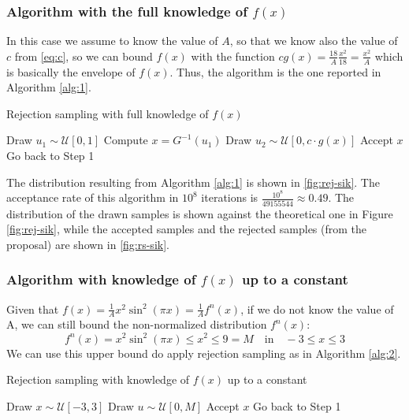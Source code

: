 \documentclass[a4paper,12pt]{article}
\begin{document}
\subsubsection{Algorithm with the full knowledge of $f(x)$}
In this case we assume to know the value of $A$, so that we know also the value of $c$ from \ref{eq:c}, so we can bound $f(x)$ with the function $cg(x) = \frac{18}{A}\frac{x^2}{18} =\frac{x^2}{A}$ which is basically the envelope of $f(x)$.
Thus, the algorithm is the one reported in Algorithm \ref{alg:1}.

\begin{algorithm}
\caption{Rejection sampling with full knowledge of $f(x)$}
\label{alg:1}
\begin{algorithmic}[1]
\STATE Draw $u_1 \sim \mathcal{U}[0,1]$
\STATE Compute $x = G^{-1}(u_1)$
\STATE Draw $u_2 \sim \mathcal{U}[0, c \cdot g(x)]$
    \STATE Accept $x$
\ELSE
    \STATE Go back to Step 1
\ENDIF
\end{algorithmic}
\end{algorithm}

The distribution resulting from Algorithm \ref{alg:1} is shown in \ref{fig:rej-sik}. The acceptance rate of this algorithm in $10^8$ iterations is $\frac{10^8}{49155544} \approx 0.49$. The distribution of the drawn samples is shown against the theoretical one in Figure \ref{fig:rej-sik}, while the accepted samples and the rejected samples (from the proposal) are shown in \ref{fig:rs-sik}.

\subsubsection{Algorithm with knowledge of $f(x)$ up to a constant}
Given that $f(x) = \frac{1}{A}x^2\sin^2(\pi x)=\frac{1}{A}f^n(x)$, if we do not know the value of A, we can still bound the non-normalized distribution $f^{n}(x)$:
\begin{equation}
    f^n(x) = x^2\sin^2(\pi x) \leq x^2 \leq 9 = M\quad \text{in}\quad -3\leq x\leq3 
\end{equation}
We can use this upper bound do apply rejection sampling as in Algorithm \ref{alg:2}.

\begin{algorithm}
\caption{Rejection sampling with knowledge of $f(x)$ up to a constant}
\label{alg:2}
\begin{algorithmic}[1]
\STATE Draw $x \sim \mathcal{U}[-3,3]$
\STATE Draw $u \sim \mathcal{U}[0, M]$
    \STATE Accept $x$
\ELSE
    \STATE Go back to Step 1
\ENDIF
\end{algorithmic}
\end{algorithm}
\end{document}
